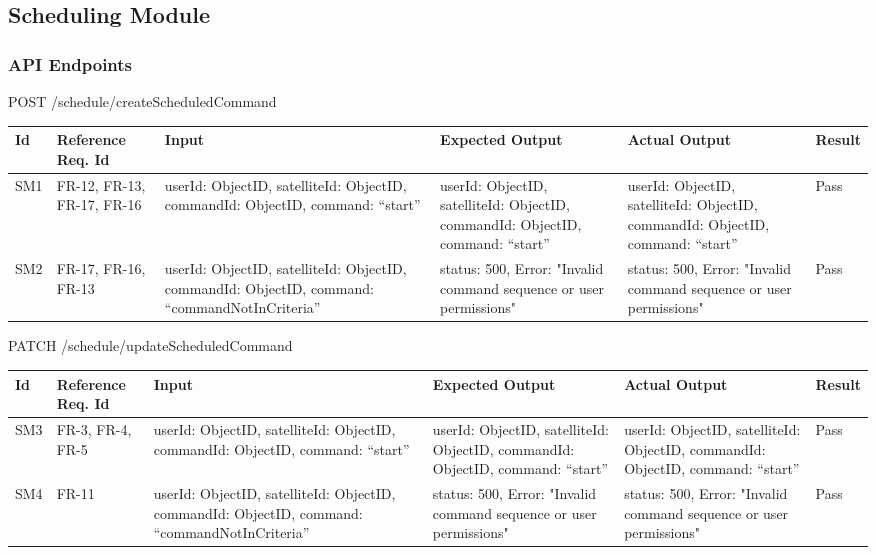 \documentclass[12pt, titlepage]{article}
\begin{document}
\subsection{Scheduling Module}
\subsubsection{API Endpoints}


POST /schedule/createScheduledCommand


\begin{center}
\begin{tabular}{|p{1cm} | p{2cm} |p{2cm}| p{2cm} |p{2cm}| p{2cm}|}
\hline
\textbf{Id} & \textbf{Reference Req. Id} & \textbf{Input} & \textbf{Expected Output} & \textbf{Actual Output} & \textbf{Result} \\
\hline
SM1 & FR-12, FR-13, FR-17, FR-16  & { userId: ObjectID,
satelliteId: ObjectID,
commandId: ObjectID,
command: “start” } & { userId: ObjectID,
satelliteId: ObjectID,
commandId: ObjectID,
command: “start” } & { userId: ObjectID,
satelliteId: ObjectID,
commandId: ObjectID,
command: “start” } & Pass
\\
\hline
SM2 & FR-17, FR-16, FR-13 & { userId: ObjectID,
satelliteId: ObjectID,
commandId: ObjectID,
command: “commandNotInCriteria” }
 & { status: 500,
Error: "Invalid command sequence or user permissions" }
 & { status: 500,
Error: "Invalid command sequence or user permissions" }
 & Pass
\\
\hline

\end{tabular}

\end{center}

PATCH /schedule/updateScheduledCommand

\begin{center}
\begin{tabular}{|p{1cm} | p{2cm} |p{2cm}| p{2cm} |p{2cm}| p{2cm}|}
\hline
\textbf{Id} & \textbf{Reference Req. Id} & \textbf{Input} & \textbf{Expected Output} & \textbf{Actual Output} & \textbf{Result} \\
\hline
SM3 & FR-3, FR-4, FR-5 & { userId: ObjectID,
satelliteId: ObjectID,
commandId: ObjectID,
command: “start” } & { userId: ObjectID,
satelliteId: ObjectID,
commandId: ObjectID,
command: “start” } & { userId: ObjectID,
satelliteId: ObjectID,
commandId: ObjectID,
command: “start” } & Pass
\\
\hline
SM4 & FR-11 & { userId: ObjectID,
satelliteId: ObjectID,
commandId: ObjectID,
command: “commandNotInCriteria” }
 & { status: 500,
Error: "Invalid command sequence or user permissions" }
 & { status: 500,
Error: "Invalid command sequence or user permissions" }
 & Pass
\\
\hline

\end{tabular}

\end{center}
\end{document}
